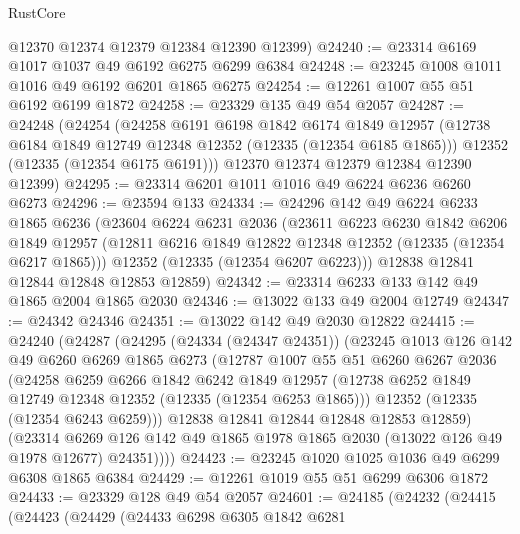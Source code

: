 \begin{lexlean}{RustCore}
\begin{coremodule}
      @12370
      @12374
      @12379
      @12384
      @12390
      @12399)
@24240 := @23314 @6169 @1017 @1037 @49 @6192 @6275 @6299 @6384
@24248 := @23245 @1008 @1011 @1016 @49 @6192 @6201 @1865 @6275
@24254 := @12261 @1007 @55 @51 @6192 @6199 @1872
@24258 := @23329 @135 @49 @54 @2057
@24287 := @24248
    (@24254
      (@24258
        @6191
        @6198
        @1842
        @6174
        @1849
        @12957
        (@12738 @6184 @1849 @12749 @12348 @12352 (@12335 (@12354 @6185 @1865)))
        @12352
        (@12335 (@12354 @6175 @6191)))
      @12370
      @12374
      @12379
      @12384
      @12390
      @12399)
@24295 := @23314 @6201 @1011 @1016 @49 @6224 @6236 @6260 @6273
@24296 := @23594 @133
@24334 := @24296
    @142
    @49
    @6224
    @6233
    @1865
    @6236
    (@23604
      @6224
      @6231
      @2036
      (@23611
        @6223
        @6230
        @1842
        @6206
        @1849
        @12957
        (@12811 @6216 @1849 @12822 @12348 @12352 (@12335 (@12354 @6217 @1865)))
        @12352
        (@12335 (@12354 @6207 @6223)))
      @12838
      @12841
      @12844
      @12848
      @12853
      @12859)
@24342 := @23314 @6233 @133 @142 @49 @1865 @2004 @1865 @2030
@24346 := @13022 @133 @49 @2004 @12749
@24347 := @24342 @24346
@24351 := @13022 @142 @49 @2030 @12822
@24415 := @24240
    (@24287
      (@24295
        (@24334 (@24347 @24351))
        (@23245
          @1013
          @126
          @142
          @49
          @6260
          @6269
          @1865
          @6273
          (@12787
            @1007
            @55
            @51
            @6260
            @6267
            @2036
            (@24258
              @6259
              @6266
              @1842
              @6242
              @1849
              @12957
              (@12738 @6252 @1849 @12749 @12348 @12352 (@12335 (@12354 @6253 @1865)))
              @12352
              (@12335 (@12354 @6243 @6259)))
            @12838
            @12841
            @12844
            @12848
            @12853
            @12859)
          (@23314
            @6269
            @126
            @142
            @49
            @1865
            @1978
            @1865
            @2030
            (@13022 @126 @49 @1978 @12677)
            @24351))))
@24423 := @23245 @1020 @1025 @1036 @49 @6299 @6308 @1865 @6384
@24429 := @12261 @1019 @55 @51 @6299 @6306 @1872
@24433 := @23329 @128 @49 @54 @2057
@24601 := @24185
    (@24232
      (@24415
        (@24423
          (@24429
            (@24433
              @6298
              @6305
              @1842
              @6281

\end{coremodule}
\end{lexlean}
